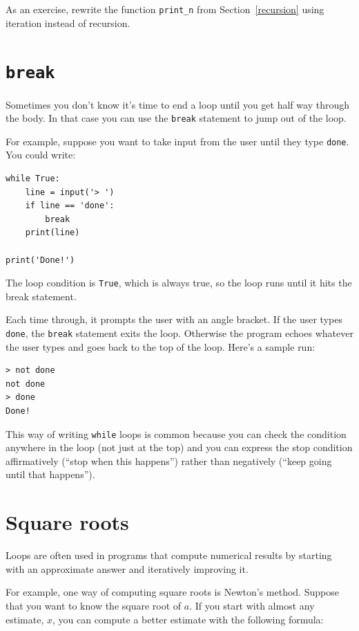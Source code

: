 \documentclass[10pt]{book}
\begin{document}
As an exercise, rewrite the function \verb"print_n" from
Section~\ref{recursion} using iteration instead of recursion.


\section{{\tt break}}

Sometimes you don't know it's time to end a loop until you get half
way through the body.  In that case you can use the {\tt break}
statement to jump out of the loop.

For example, suppose you want to take input from the user until they
type {\tt done}.  You could write:

\begin{verbatim}
while True:
    line = input('> ')
    if line == 'done':
        break
    print(line)

print('Done!')
\end{verbatim}
%
The loop condition is {\tt True}, which is always true, so the
loop runs until it hits the break statement.

Each time through, it prompts the user with an angle bracket.
If the user types {\tt done}, the {\tt break} statement exits
the loop.  Otherwise the program echoes whatever the user types
and goes back to the top of the loop.  Here's a sample run:

\begin{verbatim}
> not done
not done
> done
Done!
\end{verbatim}
%
This way of writing {\tt while} loops is common because you
can check the condition anywhere in the loop (not just at the
top) and you can express the stop condition affirmatively
(``stop when this happens'') rather than negatively (``keep going
until that happens'').


\section{Square roots}
\label{squareroot}

Loops are often used in programs that compute
numerical results by starting with an approximate answer and
iteratively improving it.

For example, one way of computing square roots is Newton's method.
Suppose that you want to know the square root of $a$.  If you start
with almost any estimate, $x$, you can compute a better
estimate with the following formula:
\end{document}
